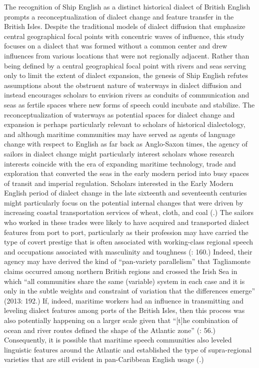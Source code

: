   The recognition of Ship English as a distinct historical dialect of British English prompts a reconceptualization of dialect change and feature transfer in the British Isles. Despite the traditional models of dialect diffusion that emphasize central geographical focal points with concentric waves of influence, this study focuses on a dialect that was formed without a common center and drew influences from various locations that were not regionally adjacent. Rather than being defined by a central geographical focal point with rivers and seas serving only to limit the extent of dialect expansion, the genesis of Ship English refutes assumptions about the obstruent nature of waterways in dialect diffusion and instead encourages scholars to envision rivers as conduits of communication and seas as fertile spaces where new forms of speech could incubate and stabilize. The reconceptualization of waterways as potential spaces for dialect change and expansion is perhaps particularly relevant to scholars of historical dialectology, and although maritime communities may have served as agents of language change with respect to English as far back as Anglo-Saxon times, the agency of sailors in dialect change might particularly interest scholars whose research interests coincide with the era of expanding maritime technology, trade and exploration that converted the seas in the early modern period into busy spaces of transit and imperial regulation. Scholars interested in the Early Modern English period of dialect change in the late sixteenth and seventeenth centuries might particularly focus on the potential internal changes that were driven by increasing coastal transportation services of wheat, cloth, and coal (\citealt{Willan1967}.) The sailors who worked in these trades were likely to have acquired and transported dialect features from port to port, particularly as their profession may have carried the type of covert prestige that is often associated with working-class regional speech and occupations associated with masculinity and toughness (\citealt{Petyt1980}: 160.) Indeed, their agency may have derived the kind of “pan-variety parallelism” that Tagliamonte claims occurred among northern British regions and crossed the Irish Sea in which “all communities share the same (variable) system in each case and it is only in the subtle weights and constraint of variation that the differences emerge” (2013: 192.) If, indeed, maritime workers had an influence in transmitting and leveling dialect features among ports of the British Isles, then this process was also potentially happening on a larger scale given that “[t]he combination of ocean and river routes defined the shape of the Atlantic zone” (\citealt{Thornton2000}: 56.) Consequently, it is possible that maritime speech communities also leveled linguistic features around the Atlantic and established the type of supra-regional varieties that are still evident in pan-Caribbean English usage (\citealt{Allsopp2003}.)  


